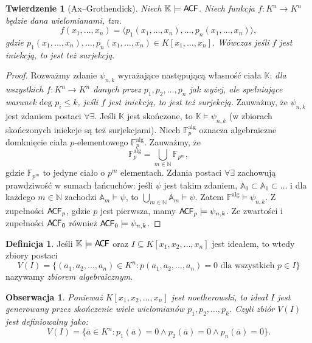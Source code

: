 \documentclass{article}
\newcommand{\N}{\mathbb{N}}
\newcommand{\A}{\mathbb{A}}
\newcommand{\F}{\mathbb{F}}
\newcommand{\K}{\mathbb{K}}
\theoremstyle{plain}
\newtheorem{tw}[thm]{Twierdzenie}
\newtheorem{obs}[thm]{Obserwacja}
\theoremstyle{definition}
\newtheorem{df}[thm]{Definicja}
\theoremstyle{remark}
\newcommand{\ACF}{\mathsf{A \mkern-2.0mu C \mkern-1.1mu F}}
\begin{document}
\begin{tw}[Ax--Grothendick]
	Niech $\mathbb{K} \models \ACF$.
	Niech funkcja $f \colon K^n \rightarrow K^n$ będzie dana wielomianami, tzn. $$f(x_1, \ldots, x_n) = \langle p_1(x_1, \ldots, x_n), \ldots, p_n(x_1, \ldots, x_n)\rangle ,$$ gdzie $p_1(x_1, \ldots, x_n), \ldots, p_n(x_1, \ldots, x_n) \in K[x_1, \ldots, x_n]$. %
	Wówczas jeśli $f$ jest iniekcją, to jest też surjekcją.
\end{tw}
\begin{proof}
	Rozważmy zdanie $\psi_{n,k}$ wyrażające następującą własność ciała $\K$:
	\textit{dla wszystkich $f \colon K^n \rightarrow K^n$ danych przez $p_1, p_2, \ldots, p_n$ jak wyżej, ale spełniające warunek $\text{deg } p_i \leq k$, jeśli $f$ jest iniekcją, to jest też surjekcją. }
	Zauważmy, że $\psi_{n,k}$ jest zdaniem postaci $\forall \exists$.
	Jeśli $\K$ jest skończone, to $\K \models \psi_{n,k}$ (w zbiorach skończonych iniekcje są też surjekcjami). %
	Niech $\F^{\text{alg}}_{p}$ oznacza algebraiczne domknięcie ciała $p$-elementowego $\F^{\text{alg}}_p$.
	Zauważmy, że $$\F^{\text{alg}}_{p} = \bigcup_{m \in \N} \F_{p^m},$$ gdzie $\F_{p^m}$ to jedyne ciało o $p^m$ elementach.
	Zdania postaci $\forall \exists$ zachowują prawdziwość w sumach łańcuchów:
	jeśli $\psi$ jest takim zdaniem, $\A_0 \subset \A_1 \subset \ldots $ i dla każdego $m \in \N$ zachodzi $\A_m \models \psi$, to $\bigcup_{m \in \N} \A_m \models \psi$.
	Zatem $\F^{\text{alg}} \models \psi_{n,k}$. %
	Z zupełności $\ACF_p$, gdzie $p$ jest pierwsza, mamy $\ACF_p \models \psi_{n,k}$.
	Ze zwartości i zupełności $\ACF_0$ również $\ACF_0 \models \psi_{n,k}$.

\end{proof}

\begin{df}
	Jeśli $\K \models \ACF$ oraz $I \subseteq K[x_1, x_2, \ldots, x_n ]$ jest ideałem, to wtedy zbiory postaci $$V(I) = \{(a_1, a_2, \ldots, a_n) \in K^n \colon p( a_1, a_2, \ldots, a_n ) = 0 \text{ dla wszystkich } p \in I\}$$ nazywamy \textit{zbiorem algebraicznym}.
\end{df}


\begin{obs}
	Ponieważ $K[x_1, x_2, \ldots, x_n ]$ jest noetherowski, to ideał $I$ jest generowany przez skończenie wiele wielomianów $p_1, p_2, \ldots, p_k$.
	Czyli zbiór $V(I)$ jest definiowalny jako:
	$$V(I) = \{ \bar{a} \in K^n \colon p_1(\bar{a}) = 0 \wedge p_2(\bar{a}) = 0 \wedge p_n(\bar{a})=0 \}.$$
\end{obs}
\end{document}
